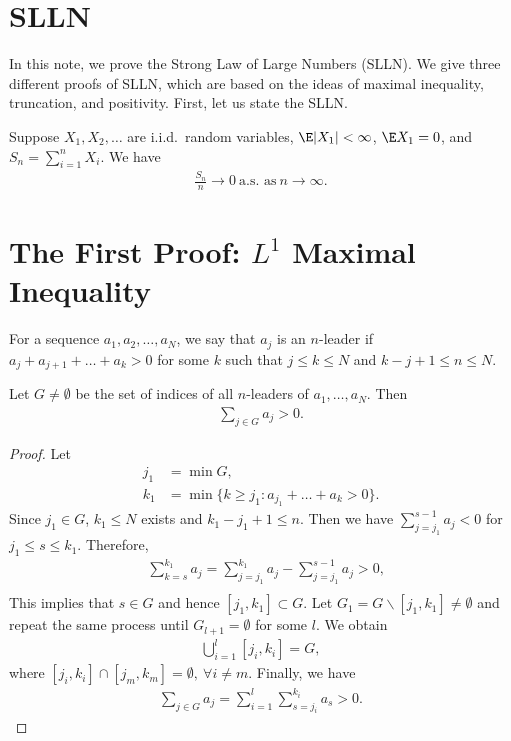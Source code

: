 \documentclass[../aipt.tex]{subfiles}
\begin{document}

\section{SLLN}
In this note, we prove the Strong Law of Large Numbers (SLLN). We give three different proofs of SLLN, which are based on the ideas of maximal inequality, truncation, and positivity. First, let us state the SLLN.

\begin{Theorem}
Suppose $X_1, X_2, \ldots$ are i.i.d.\ random variables, $\E |X_1| < \infty$, $\E X_1 = 0$, and $S_n = \sum_{i=1}^n X_i$. We have
\begin{align*}
\frac{S_n}{n} \to 0 \ \text{a.s. as} \ n \to \infty. 
\end{align*}
\end{Theorem}

\section{The First Proof: \texorpdfstring{$L^1$}{L1} Maximal Inequality}

For a sequence $a_1, a_2, \ldots, a_N$, we say that $a_j$ is an $n$-leader if $a_j + a_{j+1} + \ldots + a_k > 0$ for some $k$ such that $j \leq k \leq N$ and $k - j + 1 \leq n \leq N$.

\begin{Lemma} \label{wk7:lemma:n_leader}
Let $G \neq \emptyset$ be the set of indices of all $n$-leaders of $a_1, \ldots, a_N$. Then
\begin{align*}
\sum_{j \in G} a_j > 0.
\end{align*}
\end{Lemma}
\begin{proof}
Let
\begin{align*}
j_1 &= \min G, \\
k_1 &= \min \{k \geq j_1 : a_{j_1} + \ldots + a_k > 0\}.
\end{align*}
Since $j_1\in G$, $k_1 \leq N$ exists and $k_1 - j_1 + 1 \leq n$. Then we have $\sum_{j = j_1}^{s-1} a_j < 0$ for $j_1 \leq s \leq k_1$. Therefore, 
\begin{align*}
&\sum_{k=s}^{k_1} a_j = \sum_{j=j_1}^{k_1} a_j - \sum_{j=j_1}^{s-1} a_j > 0, \\
\end{align*}
This implies that $s \in G$ and hence $\left[j_1, k_1\right] \subset G$. Let $G_1 = G \backslash \left[j_1, k_1\right] \neq \emptyset$ and repeat the same process until $G_{l+1}=\emptyset$ for some $l$. We obtain
\begin{align*}
\bigcup_{i=1}^{l} [j_i, k_i] = G,
\end{align*}
where $\left[j_i, k_i\right] \cap \left[j_m, k_m\right] = \emptyset,\ \forall i \neq m$. Finally, we have
\begin{align*}
\sum_{j \in G} a_j = \sum_{i=1}^{l} \sum_{s=j_i}^{k_i} a_s > 0.
\end{align*}
\end{proof}
\end{document}
